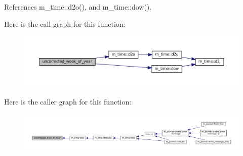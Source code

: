 References m\+\_\+time\+::d2o(), and m\+\_\+time\+::dow().

Here is the call graph for this function\+:\nopagebreak
\begin{figure}[H]
\begin{center}
\leavevmode
\includegraphics[width=350pt]{M__journal_8f90_a41382743ce1b42e02a3f42146e3fa53f_cgraph}
\end{center}
\end{figure}
Here is the caller graph for this function\+:\nopagebreak
\begin{figure}[H]
\begin{center}
\leavevmode
\includegraphics[width=350pt]{M__journal_8f90_a41382743ce1b42e02a3f42146e3fa53f_icgraph}
\end{center}
\end{figure}
